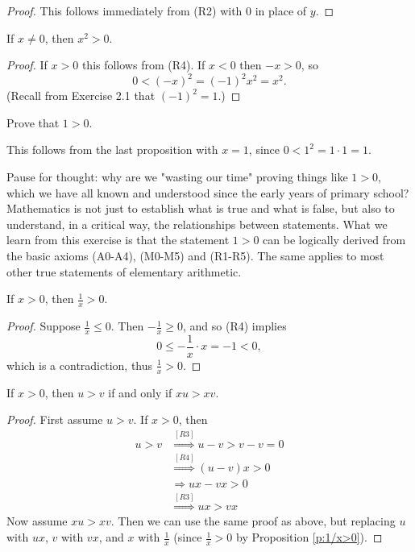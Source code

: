 \documentclass[11pt,dvipsnames]{book}
\numberwithin{figure}{section} %
\numberwithin{table}{section} %
\begin{document}
\begin{proof}
This follows immediately from (R2) with $0$ in place of $y$.
\end{proof}

\begin{proposition}
If $x\neq 0$, then $x^2>0$.
\end{proposition}

\begin{proof}
If $x>0$ this follows from (R4).  If $x<0$ then $-x>0$, so
\[
0<(-x)^2= (-1)^2x^2=x^2.
\]
(Recall from Exercise 2.1 that $(-1)^2=1$.)
\end{proof}

\begin{exercise}
Prove that $1>0$.
\begin{solution}
This follows from the last proposition with $x=1$, since $0<1^2=1\cdot 1=1$.
\end{solution}
\end{exercise}

Pause for thought: why are we "wasting our time" proving things like $1 > 0$, which we have all known and understood since the early years of primary school?
Mathematics is not just to establish what is true and what is false, but also to understand, in a critical way, the relationships between statements.
What we learn from this exercise is that the statement $1 > 0$ can be logically derived from the basic axioms (A0-A4), (M0-M5) and (R1-R5).
The same applies to most other true statements of elementary arithmetic.

\begin{proposition}
\label{p:1/x>0}
If $x>0$, then $\frac{1}{x}>0$.
\end{proposition}

\begin{proof}
Suppose $\frac{1}{x}\leq 0$. Then $-\frac{1}{x}\geq 0$, and so (R4) implies
\[
0\leq -\frac{1}{x}\cdot x = -1 < 0,\]
which is a contradiction, thus $\frac{1}{x}> 0$.
\end{proof}

\begin{proposition}
\label{p:xu>xv}
If $x>0$, then $u>v$ if and only if $xu>xv$.
\end{proposition}

\begin{proof}
First assume $u>v$. If $x>0$, then
\begin{align*}
u>v & \stackrel{[R3]}{\Longrightarrow} u-v>v-v=0\\
&  \stackrel{[R4]}{\Longrightarrow} (u-v)x>0\\
& \Longrightarrow ux-vx>0 \\
& \stackrel{[R3]}{\Longrightarrow} ux>vx
\end{align*}
Now assume $xu>xv$. Then we can use the same proof as above, but replacing $u$ with $ux$, $v$ with $vx$, and $x$ with $\frac{1}{x}$ (since $\frac{1}{x}>0$ by Proposition \ref{p:1/x>0}).
\end{proof}
\end{document}
